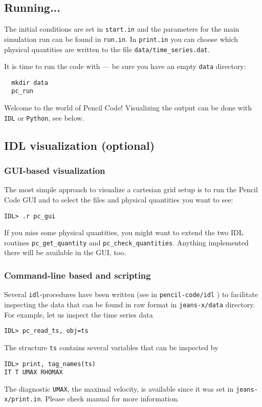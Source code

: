 \documentclass[a4paper,12pt]{article}
\begin{document}
\subsection{Running...}

The initial conditions are set in \verb|start.in| and the parameters for the main simulation run can be found in \verb|run.in|.
In \verb|print.in| you can choose which physical quantities are written to the file \verb|data/time_series.dat|.

It is time to run the code with --- be sure you have an empty \verb|data| directory:
\begin{verbatim}
  mkdir data
  pc_run
\end{verbatim}

Welcome to the world of Pencil Code! Visualizing the output can be done with \verb|IDL| or \verb|Python|, see below.

\subsection{IDL visualization (optional)}

\subsubsection{GUI-based visualization}
The most simple approach to visualize a cartesian grid setup is to run the Pencil Code GUI and to select the files and physical quantities you want to see:
\begin{verbatim}
IDL> .r pc_gui
\end{verbatim}
If you miss some physical quantities, you might want to extend the two IDL routines \verb|pc_get_quantity| and \verb|pc_check_quantities|. Anything implemented there will be available in the GUI, too.

\subsubsection{Command-line based and scripting}
Several \verb|idl|-procedures have been written
(see in \verb|pencil-code/idl| ) to facilitate inspecting the data
that can be found in raw format in \verb|jeans-x/data| directory.
For example, let us inspect the time series data
\begin{verbatim}
IDL> pc_read_ts, obj=ts
\end{verbatim}
The structure \verb|ts| contains several variables that can be inspected by
\begin{verbatim}
IDL> print, tag_names(ts)
IT T UMAX RHOMAX
\end{verbatim}
The diagnostic \verb|UMAX|, the maximal velocity, is available since it was set
in \verb|jeans-x/print.in|. Please check manual for more information.
\end{document}
